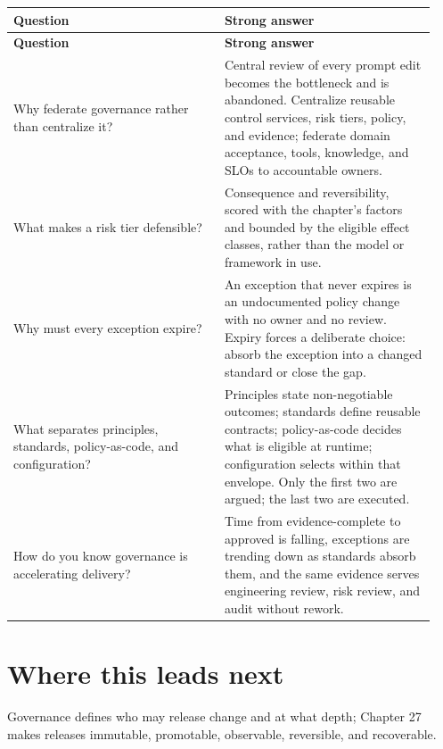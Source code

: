 \BookTableStart
\small
\begin{longtable}{@{}Y{0.4700\linewidth}Y{0.4700\linewidth}@{}}
\color{white}\bfseries \textbf{Question} & \color{white}\bfseries \textbf{Strong answer} \\
\endfirsthead
{}
\color{white}\bfseries \textbf{Question} & \color{white}\bfseries \textbf{Strong answer} \\
\endhead
Why federate governance rather than centralize it? & Central review of every prompt edit becomes the bottleneck and is abandoned. Centralize reusable control services, risk tiers, policy, and evidence; federate domain acceptance, tools, knowledge, and SLOs to accountable owners. \\
What makes a risk tier defensible? & Consequence and reversibility, scored with the chapter's factors and bounded by the eligible effect classes, rather than the model or framework in use. \\
Why must every exception expire? & An exception that never expires is an undocumented policy change with no owner and no review. Expiry forces a deliberate choice: absorb the exception into a changed standard or close the gap. \\
What separates principles, standards, policy-as-code, and configuration? & Principles state non-negotiable outcomes; standards define reusable contracts; policy-as-code decides what is eligible at runtime; configuration selects within that envelope. Only the first two are argued; the last two are executed. \\
How do you know governance is accelerating delivery? & Time from evidence-complete to approved is falling, exceptions are trending down as standards absorb them, and the same evidence serves engineering review, risk review, and audit without rework. \\
\end{longtable}
\BookTableEnd

\section{Where this leads next}

Governance defines who may release change and at what depth; Chapter 27 makes releases immutable, promotable, observable, reversible, and recoverable.\par


